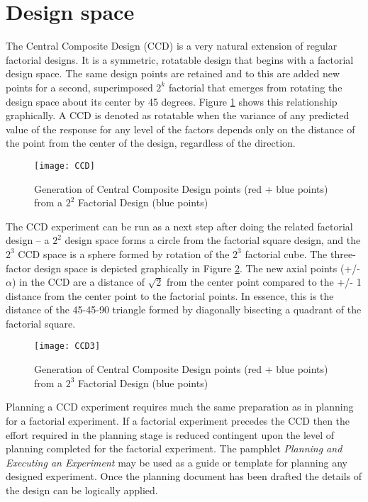 \section{Design space}
The Central Composite Design (CCD) is a very natural extension of regular factorial designs.  It is a symmetric, rotatable design that begins with a factorial design space.  The same design points are retained and to this are added new points for a second, superimposed $2^{k}$ factorial that emerges from rotating the design space about its center by 45 degrees.  Figure \ref{ccd} shows this relationship graphically. A CCD is denoted as rotatable when the variance of any predicted value of the response for any level of the factors depends only on the distance of the point from the center of the design, regardless of the direction.

\begin{figure}[h]\caption{Generation of Central Composite Design points (red + blue points) from a $2^{2}$ Factorial Design (blue points)}\label{ccd}
\begin{center}
\texttt{[image: CCD]}
\end{center}
\end{figure}

The CCD experiment can be run as a next step after doing the related factorial design -- a $2^{2}$ design space forms a circle from the factorial square design, and the $2^{3}$ CCD space is a sphere formed by rotation of the $2^{3}$ factorial cube.  The three-factor design space is depicted graphically in Figure \ref{ccd3}.  The new axial points (+/- $\alpha$) in the CCD are a distance of $\sqrt{2}$ from the center point compared to the +/- 1 distance from the center point to the factorial points.  In essence, this is the distance of the 45-45-90 triangle formed by diagonally bisecting a quadrant of the factorial square.

\begin{figure}[h]\caption{Generation of Central Composite Design points (red + blue points) from a $2^{3}$ Factorial Design (blue points)}\label{ccd3}
\begin{center}
\texttt{[image: CCD3]}
\end{center}
\end{figure}

Planning a CCD experiment requires much the same preparation as in planning for a factorial experiment.  If a factorial experiment precedes the CCD then the effort required in the planning stage is reduced contingent upon the level of planning completed for the factorial experiment. The pamphlet \textit{Planning and Executing an Experiment} may be used as a guide or template for planning any designed experiment. Once the planning document has been drafted the details of the design can be logically applied.\\


